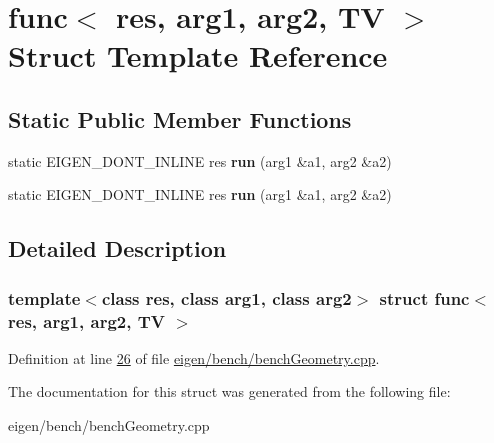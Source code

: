 \hypertarget{structfunc_3_01res_00_01arg1_00_01arg2_00_01_t_v_01_4}{}\section{func$<$ res, arg1, arg2, TV $>$ Struct Template Reference}
\label{structfunc_3_01res_00_01arg1_00_01arg2_00_01_t_v_01_4}
\subsection*{Static Public Member Functions}
\begin{DoxyCompactItemize}
\item 
\mbox{\label{structfunc_3_01res_00_01arg1_00_01arg2_00_01_t_v_01_4_a4f9f9f243ea605309c957ac8551abfb6}} 
static E\+I\+G\+E\+N\+\_\+\+D\+O\+N\+T\+\_\+\+I\+N\+L\+I\+NE res {\bfseries run} (arg1 \&a1, arg2 \&a2)
\item 
\mbox{\label{structfunc_3_01res_00_01arg1_00_01arg2_00_01_t_v_01_4_a4f9f9f243ea605309c957ac8551abfb6}} 
static E\+I\+G\+E\+N\+\_\+\+D\+O\+N\+T\+\_\+\+I\+N\+L\+I\+NE res {\bfseries run} (arg1 \&a1, arg2 \&a2)
\end{DoxyCompactItemize}


\subsection{Detailed Description}
\subsubsection*{template$<$class res, class arg1, class arg2$>$\newline
struct func$<$ res, arg1, arg2, T\+V $>$}



Definition at line \hyperlink{eigen_2bench_2bench_geometry_8cpp_source_l00026}{26} of file \hyperlink{eigen_2bench_2bench_geometry_8cpp_source}{eigen/bench/bench\+Geometry.\+cpp}.



The documentation for this struct was generated from the following file\+:\begin{DoxyCompactItemize}
\item 
eigen/bench/bench\+Geometry.\+cpp\end{DoxyCompactItemize}
